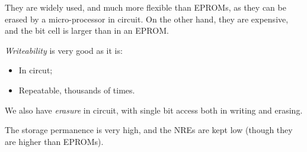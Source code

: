 \documentclass[a4paper,11pt]{article}
\begin{document}
They are widely used, and much more flexible than EPROMs, as they can be erased by a micro-processor in circuit.
On the other hand, they are expensive, and the bit cell is larger than in an EPROM.

\par\smallskip

\textit{Writeability} is very good as it is:
\begin{itemize}
	\item In circut;
	\item Repeatable, thousands of times.
\end{itemize}

We also have \textit{erasure} in circuit, with single bit access both in writing and erasing.

The storage permanence is very high, and the NREs are kept low (though they are higher than EPROMs).
\end{document}
